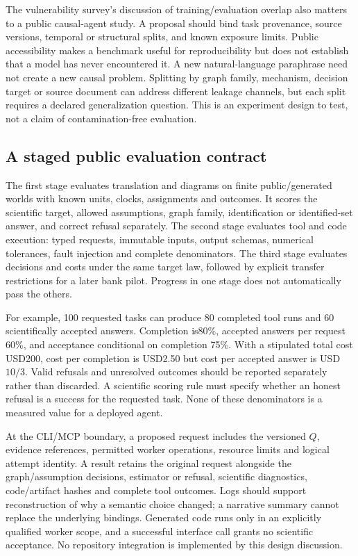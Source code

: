 The vulnerability survey's discussion of training/evaluation overlap also matters to a public causal-agent study. A proposal should bind task provenance, source versions, temporal or structural splits, and known exposure limits. Public accessibility makes a benchmark useful for reproducibility but does not establish that a model has never encountered it. A new natural-language paraphrase need not create a new causal problem. Splitting by graph family, mechanism, decision target or source document can address different leakage channels, but each split requires a declared generalization question. This is an experiment design to test, not a claim of contamination-free evaluation.~\citep{exec25_cow_vulnerability,exec25_cow_reference}

\subsection{A staged public evaluation contract}

The first stage evaluates translation and diagrams on finite public/generated worlds with known units, clocks, assignments and outcomes. It scores the scientific target, allowed assumptions, graph family, identification or identified-set answer, and correct refusal separately. The second stage evaluates tool and code execution: typed requests, immutable inputs, output schemas, numerical tolerances, fault injection and complete denominators. The third stage evaluates decisions and costs under the same target law, followed by explicit transfer restrictions for a later bank pilot. Progress in one stage does not automatically pass the others.~\citep{exec25_cow_reference}

For example, 100 requested tasks can produce 80 completed tool runs and 60 scientifically accepted answers. Completion is80\%, accepted answers per request 60\%, and acceptance conditional on completion 75\%. With a stipulated total cost USD200, cost per completion is USD2.50 but cost per accepted answer is USD$10/3$. Valid refusals and unresolved outcomes should be reported separately rather than discarded. A scientific scoring rule must specify whether an honest refusal is a success for the requested task. None of these denominators is a measured value for a deployed agent.~\citep{exec25_cow_reference}

At the CLI/MCP boundary, a proposed request includes the versioned $Q$, evidence references, permitted worker operations, resource limits and logical attempt identity. A result retains the original request alongside the graph/assumption decisions, estimator or refusal, scientific diagnostics, code/artifact hashes and complete tool outcomes. Logs should support reconstruction of why a semantic choice changed; a narrative summary cannot replace the underlying bindings. Generated code runs only in an explicitly qualified worker scope, and a successful interface call grants no scientific acceptance. No repository integration is implemented by this design discussion.~\citep{exec25_cow_reference}

